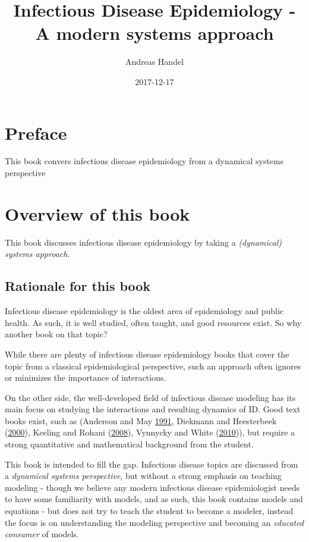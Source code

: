 \documentclass[]{book}
\title{Infectious Disease Epidemiology - A modern systems approach}
\author{Andreas Handel}
\date{2017-12-17}
\theoremstyle{definition}
\theoremstyle{definition}
\theoremstyle{definition}
\theoremstyle{remark}
\begin{document}
\maketitle

{
\setcounter{tocdepth}{1}
\tableofcontents
}
\chapter*{Preface}\label{preface}

This book convers infectious disease epidemiology from a dynamical
systems perspective

\chapter{Overview of this book}\label{overview-of-this-book}

This book discusses infectious disease epidemiology by taking a
\emph{(dynamical) systems approach}.

\section{Rationale for this book}\label{rationale-for-this-book}

Infectious disease epidemiology is the oldest area of epidemiology and
public health. As such, it is well studied, often taught, and good
resources exist. So why another book on that topic?

While there are plenty of infectious disease epidemiology books that
cover the topic from a classical epidemiological perspective, such an
approach often ignores or minimizes the importance of interactions.

On the other side, the well-developed field of infectious disease
modeling has its main focus on studying the interactions and resulting
dynamics of ID. Good text books exist, such as (Anderson and May
\protect\hyperlink{ref-anderson91}{1991}, Diekmann and Heesterbeek
(\protect\hyperlink{ref-diekmann00}{2000}), Keeling and Rohani
(\protect\hyperlink{ref-keeling08}{2008}), Vynnycky and White
(\protect\hyperlink{ref-vynnycky10}{2010})), but require a strong
quantitative and mathematical background from the student.

This book is intended to fill the gap. Infectious disease topics are
discussed from a \emph{dynamical systems perspective}, but without a
strong emphasis on teaching modeling - though we believe any modern
infectious disease epidemiologist needs to have some familiarity with
models, and as such, this book contains models and equations - but does
not try to teach the student to become a modeler, instead the focus is
on understanding the modeling perspective and becoming an \emph{educated
consumer} of models.
\end{document}
